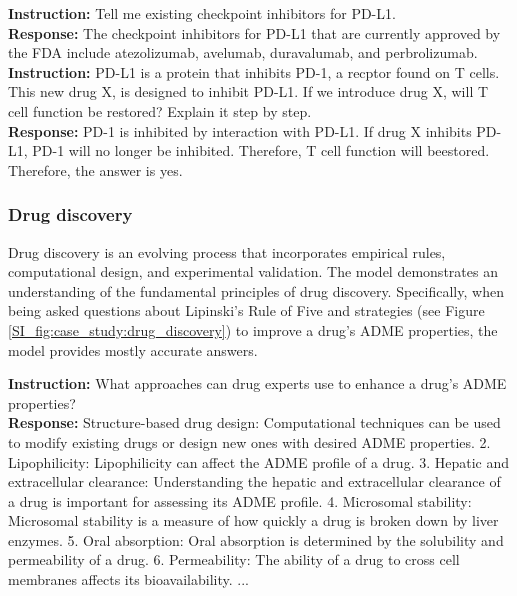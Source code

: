 \begin{mdframed}[backgroundcolor=white, linecolor=black, linewidth=1pt]  
    \noindent
    \textbf{Instruction:} Tell me existing checkpoint inhibitors for PD-L1. \\
    \textbf{Response:} The checkpoint inhibitors for PD-L1 that are currently approved by the FDA include atezolizumab, avelumab, duravalumab, and perbrolizumab.\\
    
    \noindent
    \textbf{Instruction:} PD-L1 is a protein that inhibits PD-1, a recptor found on T cells. This new drug X, is designed to inhibit PD-L1. If we introduce drug X, will T cell function be restored? Explain it step by step. \\
    \textbf{Response:}
    PD-1 is inhibited by interaction with PD-L1. If drug X inhibits PD-L1, PD-1 will no longer be inhibited. Therefore, T cell function will beestored. Therefore, the answer is yes.

\end{mdframed}  
 \label{fig:case_study:cancer_immunotherapy}

\subsubsection{Drug discovery}
Drug discovery is an evolving process that incorporates empirical rules, computational design, and experimental validation. The model demonstrates an understanding of the fundamental principles of drug discovery. Specifically, when being asked questions about Lipinski’s Rule of Five and strategies (see Figure \ref{SI_fig:case_study:drug_discovery}) to improve a drug’s ADME properties, the model provides mostly accurate answers.

\begin{mdframed}[backgroundcolor=white, linecolor=black, linewidth=1pt]  
    \textbf{Instruction:} What approaches can drug experts use to enhance a drug's ADME properties? \\
    \textbf{Response:} Structure-based drug design: Computational techniques can be used to modify existing drugs or design new ones with desired ADME properties. 2. Lipophilicity: Lipophilicity can affect the ADME profile of a drug. 3. Hepatic and extracellular clearance: Understanding the hepatic and extracellular clearance of a drug is important for assessing its ADME profile. 4. Microsomal stability: Microsomal stability is a measure of how quickly a drug is broken down by liver enzymes. 5. Oral absorption: Oral absorption is determined by the solubility and permeability of a drug. 6. Permeability: The ability of a drug to cross cell membranes affects its bioavailability. 
    ... %

\end{mdframed}  
 \label{fig:case_study:drug
_discovery}

